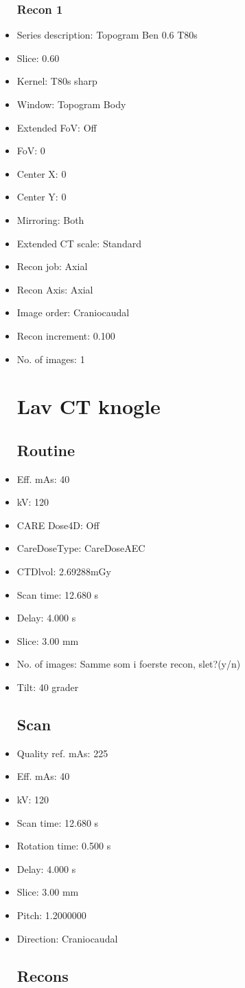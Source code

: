 \documentclass[12pt]{article}
\begin{document}
\begin{itemize}
\subsubsection{Recon 1}
\item Series description: Topogram Ben 0.6 T80s
\item Slice: 0.60
\item Kernel: T80s sharp
\item Window: Topogram Body
\item Extended FoV: Off
\item FoV: 0
\item Center X: 0
\item Center Y: 0
\item Mirroring: Both
\item Extended CT scale: Standard
\item Recon job: Axial
\item Recon Axis: Axial
\item Image order: Craniocaudal
\item Recon increment: 0.100
\item No. of images: 1
\section{Lav CT knogle}
\subsection{Routine}
\item Eff. mAs: 40\item kV: 120\item CARE Dose4D: Off\item CareDoseType: CareDoseAEC\item CTDlvol: 2.69288mGy\item Scan time: 12.680 s\item Delay: 4.000 s\item Slice: 3.00 mm\item No. of images: Samme som i foerste recon, slet?(y/n)\item Tilt: 40 grader
\subsection{Scan}
\item Quality ref. mAs: 225\item Eff. mAs: 40\item kV: 120\item Scan time: 12.680 s\item Rotation time: 0.500 s\item Delay: 4.000 s\item Slice: 3.00 mm\item Pitch: 1.2000000\item Direction: Craniocaudal\subsection{Recons}


\end{itemize}
\end{document}
